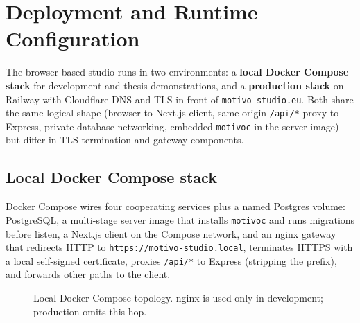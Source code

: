 \section{Deployment and Runtime Configuration}\label{sec:deployment}

The browser-based studio runs in two environments: a \textbf{local Docker Compose stack} for development and thesis
demonstrations, and a \textbf{production stack} on Railway with Cloudflare DNS and TLS in front of
\texttt{motivo-studio.eu}.
Both share the same logical shape (browser to Next.js client, same-origin \texttt{/api/*} proxy to Express, private
database networking, embedded \texttt{motivoc} in the server image) but differ in TLS termination and gateway
components.

\subsection{Local Docker Compose stack}\label{subsec:local-docker}

Docker Compose wires four cooperating services plus a named Postgres volume: PostgreSQL, a multi-stage server image
that installs \texttt{motivoc} and runs migrations before listen, a Next.js client on the Compose network, and an nginx
gateway that redirects HTTP to \texttt{https://motivo-studio.local}, terminates HTTPS with a local self-signed
certificate, proxies \texttt{/api/*} to Express (stripping the prefix), and forwards other paths to the client.

\begin{figure}[htbp]
  \centering
  \caption{Local Docker Compose topology.
  nginx is used only in development; production omits this hop.}%
  \label{fig:deployment-local}
\end{figure}

